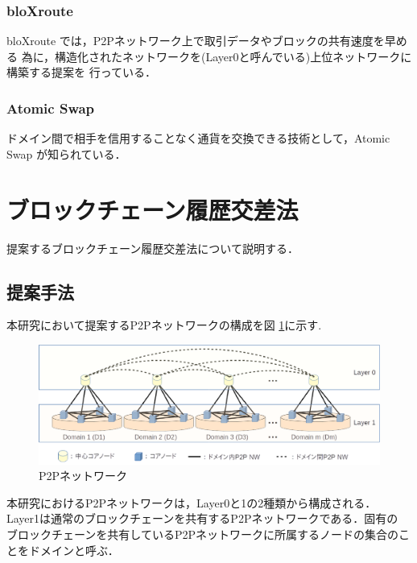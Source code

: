 \documentclass[a4paper,12pt]{jsarticle}
\begin{document}
      \subsubsection{bloXroute}
bloXroute \cite{bloX} では，P2Pネットワーク上で取引データやブロックの共有速度を早める
為に，構造化されたネットワークを(Layer0と呼んでいる)上位ネットワークに構築する提案を
行っている．

      \subsubsection{Atomic Swap}
ドメイン間で相手を信用することなく通貨を交換できる技術として，Atomic Swap \cite{atomicswap}
が知られている．

\newpage
\section{ブロックチェーン履歴交差法}
提案するブロックチェーン履歴交差法について説明する．
  \subsection{提案手法}
\label{teian}

本研究において提案するP2Pネットワークの構成を図 \ref{fig:p2p}に示す. 
%
%
\begin{figure}[tbh]
  \begin{center}
    \includegraphics[width=130mm]{pht/p2p_network_image_r1.eps}
  \end{center}
  \caption{P2Pネットワーク}
  \label{fig:p2p}
\end{figure}


本研究におけるP2Pネットワークは，Layer0と1の2種類から構成される．
Layer1は通常のブロックチェーンを共有するP2Pネットワークである．固有の
ブロックチェーンを共有しているP2Pネットワークに所属するノードの集合のことをドメインと呼ぶ．
\end{document}
